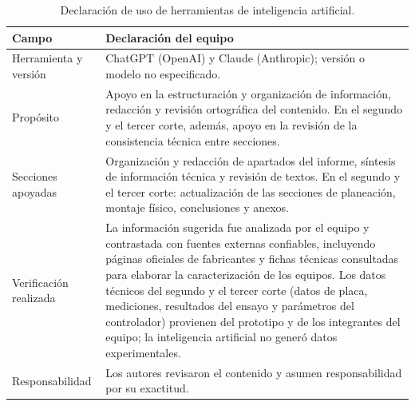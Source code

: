 \begin{table}[H]
\centering
\small
\caption{Declaración de uso de herramientas de inteligencia artificial.}
\begin{tabularx}{\textwidth}{L{3.5cm}Y}
\toprule
\textbf{Campo} & \textbf{Declaración del equipo} \\
\midrule
Herramienta y versión & ChatGPT (OpenAI) y Claude (Anthropic); versión o modelo no especificado. \\
Propósito & Apoyo en la estructuración y organización de información, redacción y revisión ortográfica del contenido. En el segundo y el tercer corte, además, apoyo en la revisión de la consistencia técnica entre secciones. \\
Secciones apoyadas & Organización y redacción de apartados del informe, síntesis de información técnica y revisión de textos. En el segundo y el tercer corte: actualización de las secciones de planeación, montaje físico, conclusiones y anexos. \\
Verificación realizada & La información sugerida fue analizada por el equipo y contrastada con fuentes externas confiables, incluyendo páginas oficiales de fabricantes y fichas técnicas consultadas para elaborar la caracterización de los equipos. Los datos técnicos del segundo y el tercer corte (datos de placa, mediciones, resultados del ensayo y parámetros del controlador) provienen del prototipo y de los integrantes del equipo; la inteligencia artificial no generó datos experimentales. \\
Responsabilidad & Los autores revisaron el contenido y asumen responsabilidad por su exactitud. \\
\bottomrule
\end{tabularx}
\end{table}